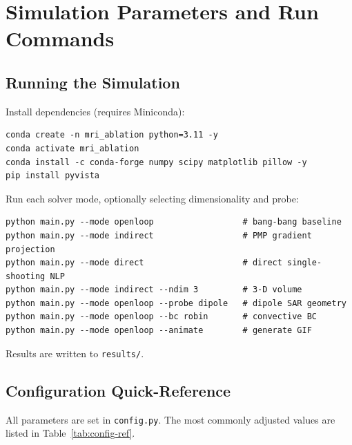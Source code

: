 \chapter[Simulation Parameters and Commands]{Simulation Parameters and Run Commands}
\label{app:sim}

\section{Running the Simulation}

Install dependencies (requires Miniconda):
\begin{verbatim}
conda create -n mri_ablation python=3.11 -y
conda activate mri_ablation
conda install -c conda-forge numpy scipy matplotlib pillow -y
pip install pyvista
\end{verbatim}

Run each solver mode, optionally selecting dimensionality and probe:
\begin{verbatim}
python main.py --mode openloop                  # bang-bang baseline
python main.py --mode indirect                  # PMP gradient projection
python main.py --mode direct                    # direct single-shooting NLP
python main.py --mode indirect --ndim 3         # 3-D volume
python main.py --mode openloop --probe dipole   # dipole SAR geometry
python main.py --mode openloop --bc robin       # convective BC
python main.py --mode openloop --animate        # generate GIF
\end{verbatim}

Results are written to \texttt{results/}.

\section{Configuration Quick-Reference}

All parameters are set in \texttt{config.py}.
The most commonly adjusted values are listed in
Table~\ref{tab:config-ref}.

